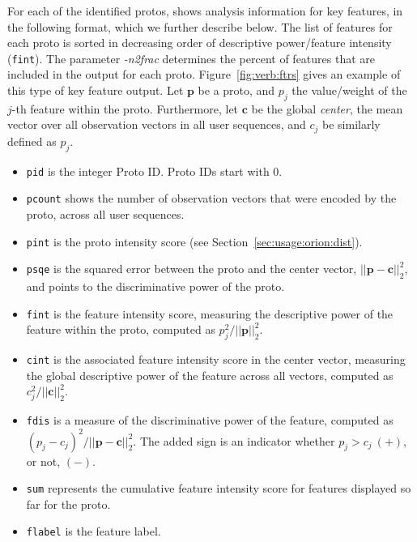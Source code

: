 \documentclass[]{article}
\def\vec#1{{\mathbf{\boldsymbol #1}}}
\begin{document}
For each of the identified protos, \orionp shows analysis information for key
features, in the following format,\newline
{}\newline
{}\newline 
{}\newline 
\indent{\tt \quad $\ldots$ ,}\newline
%
which we further describe below. The list of features for each proto is sorted
in decreasing order of descriptive power/feature intensity ({\tt fint}). The
parameter \emph{-n2frac} determines the percent of features that are included in the
output for each proto. Figure~\ref{fig:verb:ftrs} gives an example of this type
of key feature output. Let $\vec p$ be a proto, and $p_j$ the value/weight of
the $j$-th feature within the proto. Furthermore, let $\vec c$ be the global
\emph{center}, the mean vector over all observation vectors in all user
sequences, and $c_j$ be similarly defined as $p_j$.
\begin{itemize}
  \item {\tt pid} is the integer Proto ID. Proto IDs start with 0.

  \item {\tt pcount} shows the number of observation vectors that were encoded by
  the proto, across all user sequences.

  \item {\tt pint} is the proto intensity score (see Section~\ref{sec:usage:orion:dist}).
  
  \item {\tt psqe} is the squared error between the proto and the center vector,
  $||\vec p - \vec c||_2^2$, and points to the discriminative power of the
  proto.

  \item {\tt fint} is the feature intensity score, measuring the descriptive power
  of the feature within the proto, computed as $p_j^2/||\vec p||_2^2$. 

  \item {\tt cint} is the associated feature intensity score in the center vector,
  measuring the global descriptive power of the feature across all vectors,
  computed as $c_j^2/||\vec c||_2^2$.

  \item {\tt fdis} is a measure of the discriminative power of the feature, computed
  as $(p_j - c_j)^2/||\vec p - \vec c||_2^2$. The added sign is an indicator
  whether $p_j > c_j\ (+)$, or not, $(-)$.

  \item {\tt sum} represents the cumulative feature intensity score for features
  displayed so far for the proto.

  \item {\tt flabel} is the feature label.

\end{itemize}
\end{document}
